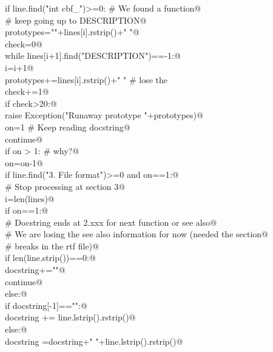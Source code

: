 \documentclass[10pt,a4paper,twoside,notitlepage]{article}
\begin{document}
\begin{flushleft}
\begin{list}{}{}
\mbox{}\verb@   if line.find("int cbf_")>=0: # We found a function@\\
\mbox{}\verb@      # keep going up to DESCRIPTION@\\
\mbox{}\verb@      prototypes=""+lines[i].rstrip()+" "@\\
\mbox{}\verb@      check=0@\\
\mbox{}\verb@      while lines[i+1].find("DESCRIPTION")==-1:@\\
\mbox{}\verb@         i=i+1@\\
\mbox{}\verb@         prototypes+=lines[i].rstrip()+" " # lose the \n@\\
\mbox{}\verb@         check+=1@\\
\mbox{}\verb@         if check>20:@\\
\mbox{}\verb@            raise Exception("Runaway prototype "+prototypes)@\\
\mbox{}\verb@      on=1 # Keep reading docstring@\\
\mbox{}\verb@      continue@\\
\mbox{}\verb@   if on > 1: # why?@\\
\mbox{}\verb@      on=on-1@\\
\mbox{}\verb@   if line.find("3. File format")>=0 and on==1:@\\
\mbox{}\verb@      # Stop processing at section 3@\\
\mbox{}\verb@      i=len(lines)@\\
\mbox{}\verb@   if on==1:@\\
\mbox{}\verb@      # Docstring ends at 2.xxx for next function or see also@\\
\mbox{}\verb@      # We are losing the see also information for now (needed the section@\\
\mbox{}\verb@      # breaks in the rtf file)@\\
\mbox{}\verb@      if len(line.strip())==0:@\\
\mbox{}\verb@         docstring+="\n"@\\
\mbox{}\verb@         continue@\\
\mbox{}\verb@      else:@\\
\mbox{}\verb@         if docstring[-1]=="\n":@\\
\mbox{}\verb@            docstring += line.lstrip().rstrip()@\\
\mbox{}\verb@         else:@\\
\mbox{}\verb@            docstring =docstring+" "+line.lstrip().rstrip()@\\

\end{list}
\end{flushleft}
\end{document}
